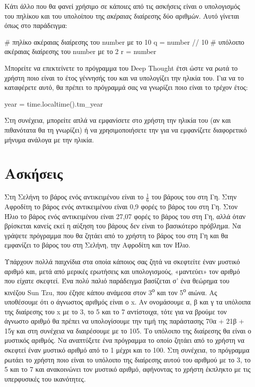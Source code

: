 \documentclass[a4paper,11pt,oneside]{book}
\begin{document}
Κάτι άλλο που θα φανεί χρήσιμο σε κάποιες από τις ασκήσεις είναι ο υπολογισμός του πηλίκου και του υπολοίπου της \emph{ακέραιας} διαίρεσης δύο αριθμών. Αυτό γίνεται όπως στο παράδειγμα:

\begin{pycode}
# πηλίκο ακέραιας διαίρεσης του number με το 10
q = number // 10
# υπόλοιπο ακέραιας διαίρεσης του number με το 2
r = number %
\end{pycode}

\begin{exercise}
Μπορείτε να επεκτείνετε το πρόγραμμα του Deep Thought έτσι ώστε να ρωτά το χρήστη ποιο είναι το έτος γέννησής του και να υπολογίζει την ηλικία του. Για να το καταφέρετε αυτό, θα πρέπει το πρόγραμμά σας να γνωρίζει ποιο είναι το τρέχον έτος:

{\upshape 
\begin{pycode}
year = time.localtime().tm_year
\end{pycode}
}

Στη συνέχεια, μπορείτε απλά να εμφανίσετε στο χρήστη την ηλικία του (αν και πιθανότατα θα τη γνωρίζει) ή να χρησιμοποιήσετε την  για να εμφανίζετε διαφορετικό μήνυμα ανάλογα με την ηλικία.
\end{exercise}

\section{Ασκήσεις}

\begin{exercise}
Στη Σελήνη το βάρος ενός αντικειμένου είναι το $\frac{1}{6}$ του βάρους του στη Γη.
Στην Αφροδίτη το βάρος ενός αντικειμένου είναι 0,9 φορές το βάρος του στη Γη. 
Στον Ήλιο το βάρος ενός αντικειμένου είναι 27,07 φορές το βάρος του στη Γη, αλλά όταν βρίσκεται κανείς εκεί η αύξηση του βάρους δεν είναι το βασικότερο πρόβλημα.
Να γράψετε πρόγραμμα που θα ζητάει από το χρήστη το βάρος του στη Γη και θα εμφανίζει το βάρος του στη Σελήνη, την Αφροδίτη και τον Ήλιο. 
\end{exercise}

\begin{exercise} %
Υπάρχουν πολλά παιχνίδια στα οποία κάποιος σας ζητά να σκεφτείτε έναν μυστικό αριθμό και, μετά από μερικές ερωτήσεις και υπολογισμούς, «μαντεύει» τον αριθμό που είχατε σκεφτεί. Ένα πολύ παλιό παράδειγμα βασίζεται σ' ένα θεώρημα του κινέζου Sun Tzu, που έζησε κάπου ανάμεσα στον 3\textsuperscript{ο} και τον 5\textsuperscript{ο} αιώνα. Ας υποθέσουμε ότι ο άγνωστος αριθμός είναι ο x. Αν ονομάσουμε α, β και γ τα υπόλοιπα της διαίρεσης του x με το 3, το 5 και το 7 αντίστοιχα, τότε για να βρούμε τον άγνωστο αριθμό θα πρέπει να υπολογίσουμε την τιμή της παράστασης 70α + 21β + 15γ και στη συνέχεια να διαιρέσουμε με το 105. Το υπόλοιπο της διαίρεσης θα είναι ο μυστικός αριθμός. Να αναπτύξετε ένα πρόγραμμα το οποίο ζητάει από το χρήστη να σκεφτεί έναν μυστικό αριθμό από το 1 μέχρι και το 100. Στη συνέχεια, το πρόγραμμα ρωτάει το χρήστη ποιο είναι το υπόλοιπο της διαίρεσης αυτού του αριθμού με το 3, το 5 και το 7 και ανακοινώνει τον μυστικό αριθμό, αφήνοντας το χρήστη έκπληκτο με τις υπερφυσικές του ικανότητες.
\end{exercise}
\end{document}
